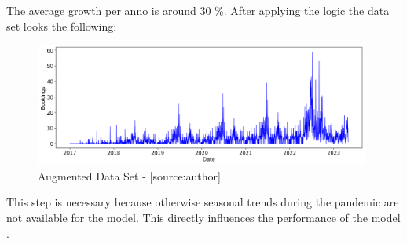 The average growth per anno is around 30 \%. After applying the logic the data set looks the following:  
\begin{figure}[H]
	\centering
		\includegraphics[width=11cm]{images/with_augmentation}
	\caption{Augmented Data Set - [source:author]}
	\label{fig:augmented_data}
\end{figure}
This step is necessary because otherwise seasonal trends during the pandemic are not available for the model. This directly influences the performance of the model \cite{data_qual}.
